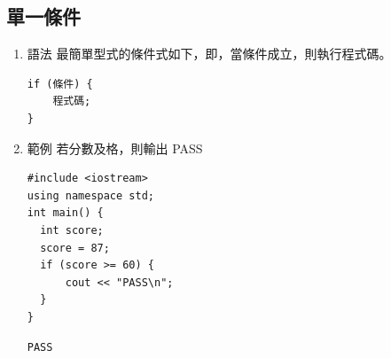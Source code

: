 \documentclass[a4paper,12pt]{article}
\begin{document}
\subsection{單一條件}
\label{sec:org476face}
\begin{enumerate}
\item 語法
\label{sec:org27dff94}
最簡單型式的條件式如下，即，當條件成立，則執行程式碼。\\
\lstset{breaklines=true,language=cpp,label= ,caption= ,captionpos=b,numbers=none}
\begin{lstlisting}
if (條件) {
    程式碼;
}
\end{lstlisting}

\item 範例
\label{sec:orgba322ce}
若分數及格，則輸出 PASS\\
\lstset{breaklines=true,language=cpp,label= ,caption= ,captionpos=b,firstnumber=1,numbers=left}
\begin{lstlisting}
#include <iostream>
using namespace std;
int main() {
  int score;
  score = 87;
  if (score >= 60) {
      cout << "PASS\n";
  }
}
\end{lstlisting}

\begin{verbatim}
PASS
\end{verbatim}


\end{enumerate}
\end{document}
